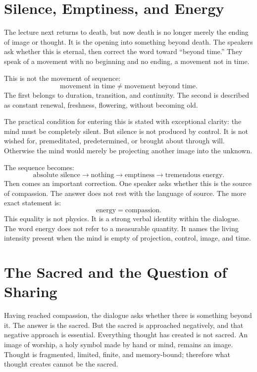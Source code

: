 \section{Silence, Emptiness, and Energy}

The lecture next returns to death, but now death is no longer merely the ending of image or thought. It is the opening into something beyond death. The speakers ask whether this is eternal, then correct the word toward ``beyond time.'' They speak of a movement with no beginning and no ending, a movement not in time.

This is not the movement of sequence:
\begin{equation}
\text{movement in time}
\neq
\text{movement beyond time}.
\end{equation}
The first belongs to duration, transition, and continuity. The second is described as constant renewal, freshness, flowering, without becoming old.

The practical condition for entering this is stated with exceptional clarity: the mind must be completely silent. But silence is not produced by control. It is not wished for, premeditated, predetermined, or brought about through will. Otherwise the mind would merely be projecting another image into the unknown.

The sequence becomes:
\begin{equation}
\text{absolute silence}
\longrightarrow
\text{nothing}
\longrightarrow
\text{emptiness}
\longrightarrow
\text{tremendous energy}.
\end{equation}
Then comes an important correction. One speaker asks whether this is the source of compassion. The answer does not rest with the language of source. The more exact statement is:
\begin{equation}
\text{energy} = \text{compassion}.
\end{equation}
This equality is not physics. It is a strong verbal identity within the dialogue. The word energy does not refer to a measurable quantity. It names the living intensity present when the mind is empty of projection, control, image, and time.

\section{The Sacred and the Question of Sharing}

Having reached compassion, the dialogue asks whether there is something beyond it. The answer is the sacred. But the sacred is approached negatively, and that negative approach is essential. Everything thought has created is not sacred. An image of worship, a holy symbol made by hand or mind, remains an image. Thought is fragmented, limited, finite, and memory-bound; therefore what thought creates cannot be the sacred.

